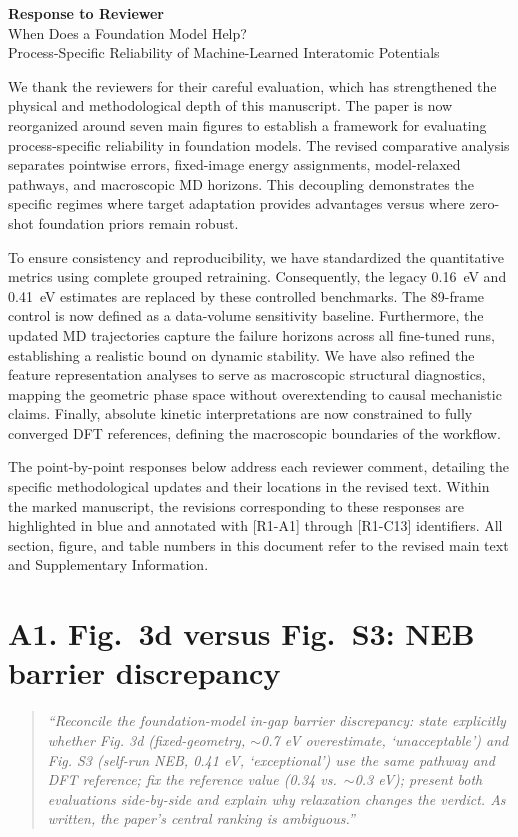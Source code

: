 \documentclass[11pt]{article}
\begin{document}
\begin{center}
{\Large\bfseries Response to Reviewer}\\[4pt]
{\large When Does a Foundation Model Help?}\\
Process-Specific Reliability of Machine-Learned Interatomic Potentials
\end{center}
We thank the reviewers for their careful evaluation, which has strengthened the physical and methodological depth of this manuscript. The paper is now reorganized around seven main figures to establish a framework for evaluating process-specific reliability in foundation models. The revised comparative analysis separates pointwise errors, fixed-image energy assignments, model-relaxed pathways, and macroscopic MD horizons. This decoupling demonstrates the specific regimes where target adaptation provides advantages versus where zero-shot foundation priors remain robust.

To ensure consistency and reproducibility, we have standardized the quantitative metrics using complete grouped retraining. Consequently, the legacy 0.16~eV and 0.41~eV estimates are replaced by these controlled benchmarks. The 89-frame control is now defined as a data-volume sensitivity baseline. Furthermore, the updated MD trajectories capture the failure horizons across all fine-tuned runs, establishing a realistic bound on dynamic stability. We have also refined the feature representation analyses to serve as macroscopic structural diagnostics, mapping the geometric phase space without overextending to causal mechanistic claims. Finally, absolute kinetic interpretations are now constrained to fully converged DFT references, defining the macroscopic boundaries of the workflow.

The point-by-point responses below address each reviewer comment, detailing the specific methodological updates and their locations in the revised text. Within the marked manuscript, the revisions corresponding to these responses are highlighted in blue and annotated with [R1-A1] through [R1-C13] identifiers. All section, figure, and table numbers in this document refer to the revised main text and Supplementary Information.

\section*{A1. Fig.~3d versus Fig.~S3: NEB barrier discrepancy}

\begin{quote}\small \itshape
``Reconcile the foundation-model in-gap barrier discrepancy: state explicitly whether Fig. 3d (fixed-geometry, $\sim$0.7 eV overestimate, `unacceptable') and Fig. S3 (self-run NEB, 0.41 eV, `exceptional') use the same pathway and DFT reference; fix the reference value (0.34 vs.\ $\sim$0.3 eV); present both evaluations side-by-side and explain why relaxation changes the verdict. As written, the paper's central ranking is ambiguous.''\end{quote}
\end{document}
